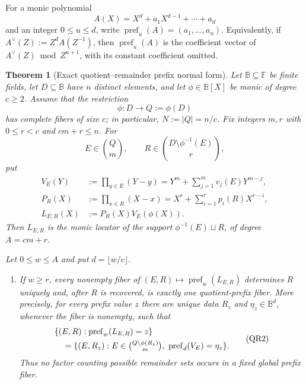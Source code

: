 \documentclass[12pt,a4paper]{amsart}
\numberwithin{equation}{section}
\newtheorem{theorem}{Theorem}[section]
\theoremstyle{remark}
\newcommand{\F}{\mathbb F}
\newcommand{\B}{\mathbb B}
\begin{document}
For a monic polynomial
\[
 A(X)=X^d+a_1X^{d-1}+\cdots+a_d
\]
and an integer $0\le u\le d$, write
\(\operatorname{pref}_u(A)=(a_1,\ldots,a_u)\).  Equivalently, if
\(A^\vee(Z):=Z^dA(Z^{-1})\), then
\(\operatorname{pref}_u(A)\) is the coefficient vector of
\(A^\vee(Z)\bmod Z^{u+1}\), with its constant coefficient omitted.

\begin{theorem}[Exact quotient--remainder prefix normal form]
\label{thm:exact-quotient-remainder-normal-form}
Let $\B\subseteq\F$ be finite fields, let $D\subseteq\B$ have $n$
distinct elements, and let $\phi\in\B[X]$ be monic of degree $c\ge2$.
Assume that the restriction
\[
             \phi:D\longrightarrow Q:=\phi(D)
\]
has complete fibers of size $c$; in particular, $N:=|Q|=n/c$.
Fix integers $m,r$ with $0\le r<c$ and $cm+r\le n$.  For
\[
 E\in\binom Qm,
 \qquad
 R\in\binom{D\setminus\phi^{-1}(E)}r,
\]
put
\[
 \begin{split}
 V_E(Y)&:=\prod_{y\in E}(Y-y)
       =Y^m+\sum_{j=1}^m v_j(E)Y^{m-j},\\
 P_R(X)&:=\prod_{x\in R}(X-x)
       =X^r+\sum_{i=1}^r p_i(R)X^{r-i},\\
 L_{E,R}(X)&:=P_R(X)V_E(\phi(X)).
 \end{split}                                      \tag{QR1}\label{eq:qr-locators}
\]
Then $L_{E,R}$ is the monic locator of the support
\(\phi^{-1}(E)\sqcup R\), of degree $A=cm+r$.

Let $0\le w\le A$ and put $d=\lfloor w/c\rfloor$.

\begin{enumerate}[label=\textup{(\roman*)},leftmargin=*]
\item If $w\ge r$, every nonempty fiber of
      \((E,R)\mapsto\operatorname{pref}_w(L_{E,R})\) determines $R$
      uniquely and, after $R$ is recovered, is exactly one quotient-prefix
      fiber.  More precisely, for every prefix value $z$ there are unique
      data $R_z$ and $\eta_z\in\B^d$, whenever the fiber is nonempty, such
      that
      \[
      \begin{split}
       &\{(E,R):\operatorname{pref}_w(L_{E,R})=z\}\\
       &\quad=
       \{(E,R_z): E\in\tbinom{Q\setminus\phi(R_z)}m,
           \ \operatorname{pref}_d(V_E)=\eta_z\}.
      \end{split}                                  \tag{QR2}\label{eq:qr-fiber-exact}
      \]
      Thus no factor counting possible remainder sets occurs in a fixed
      global prefix fiber.


\end{enumerate}
\end{theorem}
\end{document}
